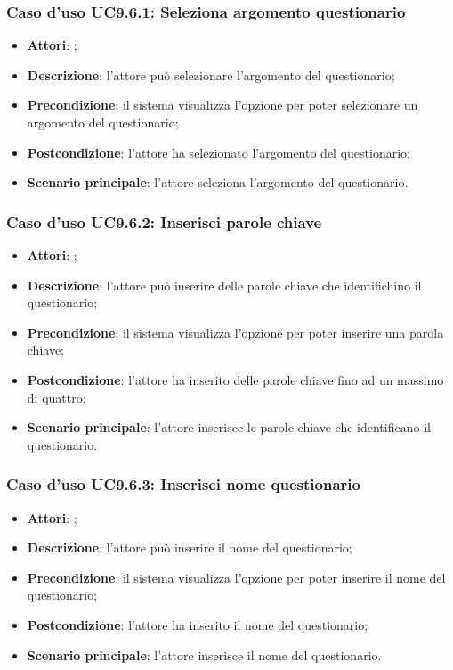 		\subsubsection{Caso d'uso UC9.6.1: Seleziona argomento questionario}
		\label{UC9.6.1}
		\begin{itemize}
			\item \textbf{Attori}: \uaupro{};
			\item \textbf{Descrizione}: l'attore può selezionare l'argomento del questionario; 
			\item \textbf{Precondizione}: il sistema visualizza l'opzione per poter selezionare un argomento del questionario;
			\item \textbf{Postcondizione}: l'attore ha selezionato l'argomento del questionario;
			\item \textbf{Scenario principale}: l'attore seleziona l'argomento del questionario.
		\end{itemize}
		
		\subsubsection{Caso d'uso UC9.6.2: Inserisci parole chiave}
		\label{UC9.6.2}
		\begin{itemize}
			\item \textbf{Attori}: \uaupro{};
			\item \textbf{Descrizione}: l'attore può inserire delle parole chiave che identifichino il questionario; 
			\item \textbf{Precondizione}: il sistema visualizza l'opzione per poter inserire una parola chiave;
			\item \textbf{Postcondizione}: l'attore ha inserito delle parole chiave fino ad un massimo di quattro; 
			\item \textbf{Scenario principale}: l'attore inserisce le parole chiave che identificano il questionario.
		\end{itemize}
			
		\subsubsection{Caso d'uso UC9.6.3: Inserisci nome questionario}
		\label{UC9.6.3}
		\begin{itemize}
			\item \textbf{Attori}: \uaupro{};
			\item \textbf{Descrizione}: l'attore può inserire il nome del questionario; 
			\item \textbf{Precondizione}: il sistema visualizza l'opzione per poter inserire il nome del questionario;
			\item \textbf{Postcondizione}: l'attore ha inserito il nome del questionario; 
			\item \textbf{Scenario principale}: l'attore inserisce il nome del questionario.
		\end{itemize}
				
